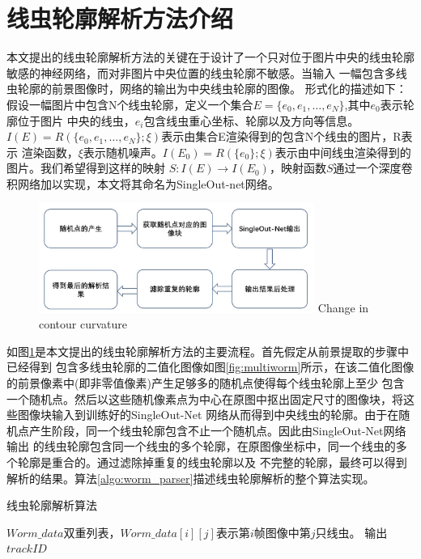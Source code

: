\section{线虫轮廓解析方法介绍}
	本文提出的线虫轮廓解析方法的关键在于设计了一个只对位于图片中央的线虫轮廓敏感的神经网络，而对非图片中央位置的线虫轮廓不敏感。当输入
	一幅包含多线虫轮廓的前景图像时，网络的输出为中央线虫轮廓的图像。
	形式化的描述如下：假设一幅图片中包含N个线虫轮廓，定义一个集合$E =\{e_0,e_1,\dots,e_N\}$,其中$e_0$表示轮廓位于图片
	中央的线虫，$e_i$包含线虫重心坐标、轮廓以及方向等信息。$I(E)=R(\{e_0,e_1,\dots,e_N\};\xi)$表示由集合E渲染得到的包含N个线虫的图片，R表示
	渲染函数，$\xi$表示随机噪声。$I(E_0)=R(\{e_0\};\xi)$表示由中间线虫渲染得到的图片。我们希望得到这样的映射
	$S:I(E)\rightarrow I(E_0)$，映射函数$S$通过一个深度卷积网络加以实现，本文将其命名为SingleOut-net网络。
	\begin{figure}[htb]
	  \centering
	  \includegraphics[width=9cm]{figure/chap4/flow.jpg}
		{Change in contour curvature}
	  \label{fig:chap4:flow}
	\end{figure}
	
	如图\ref{fig:chap4:flow}是本文提出的线虫轮廓解析方法的主要流程。首先假定从前景提取的步骤中已经得到
	包含多线虫轮廓的二值化图像如图\ref{fig:multiworm}所示，在该二值化图像的前景像素中(即非零值像素)产生足够多的随机点使得每个线虫轮廓上至少
	包含一个随机点。然后以这些随机像素点为中心在原图中抠出固定尺寸的图像块，将这些图像块输入到训练好的SingleOut-Net
	网络从而得到中央线虫的轮廓。由于在随机点产生阶段，同一个线虫轮廓包含不止一个随机点。因此由SingleOut-Net网络输出
	的线虫轮廓包含同一个线虫的多个轮廓，在原图像坐标中，同一个线虫的多个轮廓是重合的。通过滤除掉重复的线虫轮廓以及
	不完整的轮廓，最终可以得到解析的结果。算法\ref{algo:worm_parser}描述线虫轮廓解析的整个算法实现。
\begin{algorithm}
\caption{线虫轮廓解析算法}
\label{algo:worm_parser}
\begin{algorithmic}[1]
\Require $Worm\_data$双重列表，$Worm\_data[i][j]$表示第$i$帧图像中第$j$只线虫。
\Ensure 输出$trackID$
\end{algorithmic}
\end{algorithm}

